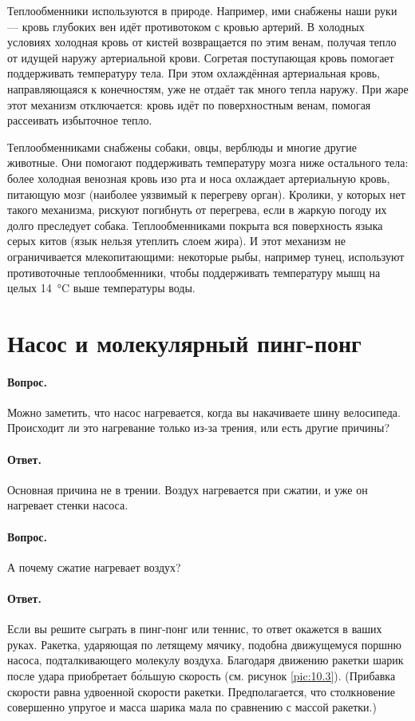 Теплообменники используются в природе.
Например, ими снабжены наши руки --- кровь глубоких вен идёт противотоком с кровью артерий.
В холодных условиях холодная кровь от кистей возвращается по этим венам, получая тепло от идущей наружу артериальной крови. Согретая поступающая кровь помогает поддерживать температуру тела.
При этом охлаждённая артериальная кровь, направляющаяся к конечностям, уже не отдаёт так много тепла наружу.
При жаре этот механизм отключается: кровь идёт по поверхностным венам, помогая рассеивать избыточное тепло.

Теплообменниками снабжены собаки, овцы, верблюды и многие другие животные.
Они помогают поддерживать температуру мозга ниже остального тела: более холодная венозная кровь изо рта и носа охлаждает артериальную кровь, питающую мозг (наиболее уязвимый к перегреву орган).
Кролики, у которых нет такого механизма, рискуют погибнуть от перегрева, если в жаркую погоду их долго преследует собака.
Теплообменниками покрыта вся поверхность языка серых китов (язык нельзя утеплить слоем жира).
И этот механизм не ограничивается млекопитающими: некоторые рыбы, например тунец, используют противоточные теплообменники, чтобы поддерживать температуру мышц на целых 14~°C выше температуры воды.

\section{Насос и молекулярный пинг-понг}
\label{Насос и молекулярный пинг-понг}

\paragraph{Вопрос.}
Можно заметить, что насос нагревается, когда вы накачиваете шину велосипеда.
Происходит ли это нагревание только из-за трения, или есть другие причины?

\paragraph{Ответ.}
Основная причина не в трении.
Воздух нагревается при сжатии, и уже он нагревает стенки насоса.

\paragraph{Вопрос.} А почему сжатие нагревает воздух?

\paragraph{Ответ.}
Если вы решите сыграть в пинг-понг или теннис, то ответ окажется в ваших руках.
Ракетка, ударяющая по летящему мячику, подобна движущемуся поршню насоса, подталкивающего молекулу воздуха.
Благодаря движению ракетки шарик после удара приобретает б\'{о}льшую скорость (см. рисунок \ref{pic:10.3}).
(Прибавка скорости равна удвоенной скорости ракетки.
Предполагается, что столкновение совершенно упругое и масса шарика мала по сравнению с массой ракетки.)


